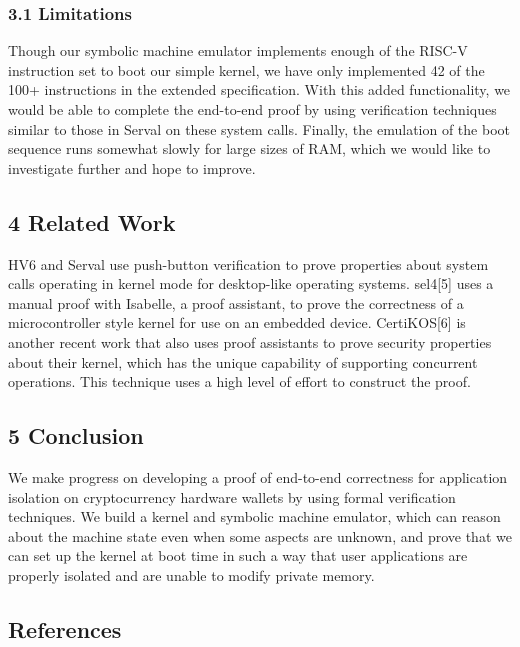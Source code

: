 \documentclass[]{article}
\begin{document}
\subsubsection{3.1 Limitations}\label{limitations}

Though our symbolic machine emulator implements enough of the RISC-V
instruction set to boot our simple kernel, we have only implemented 42
of the 100+ instructions in the extended specification. With this added
functionality, we would be able to complete the end-to-end proof by
using verification techniques similar to those in Serval on these system
calls. Finally, the emulation of the boot sequence runs somewhat slowly
for large sizes of RAM, which we would like to investigate further and
hope to improve.

\subsection{4 Related Work}\label{related-work}

HV6 and Serval use push-button verification to prove properties about
system calls operating in kernel mode for desktop-like operating
systems. sel4{[}5{]} uses a manual proof with Isabelle, a proof
assistant, to prove the correctness of a microcontroller style kernel
for use on an embedded device. CertiKOS{[}6{]} is another recent work
that also uses proof assistants to prove security properties about their
kernel, which has the unique capability of supporting concurrent
operations. This technique uses a high level of effort to construct the
proof.

\subsection{5 Conclusion}\label{conclusion}

We make progress on developing a proof of end-to-end correctness for
application isolation on cryptocurrency hardware wallets by using formal
verification techniques. We build a kernel and symbolic machine
emulator, which can reason about the machine state even when some
aspects are unknown, and prove that we can set up the kernel at boot
time in such a way that user applications are properly isolated and are
unable to modify private memory.

\subsection{References}\label{references}
\end{document}
